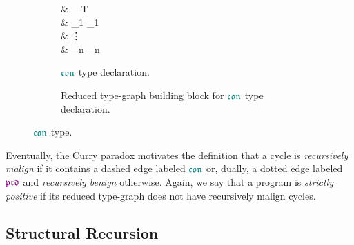 \begin{figure}[H]
  \begin{subfigure}[b]{0.25\textwidth}
    \begin{codealign}
      &
        \polcon\ \type\ T\ \where
      \\[-4pt]
      &\quad
        _{1} \Delta_{1}
      \\[-4pt]
      &\quad\quad
        \vdots
      \\[-4pt]
      &\quad
        _{n} \Delta_{n}
    \end{codealign}
    \caption{$\polcon$ type declaration.}
    \label{fig:mainideas:contg:cont}
  \end{subfigure}
  \begin{subfigure}[b]{0.7\textwidth}
    \caption{Reduced type-graph building block for $\polcon$ type declaration.}
    \label{fig:mainideas:contg:tg}
  \end{subfigure}
  \caption{$\polcon$ type.}
  \label{fig:mainideas:contg}
\end{figure}

Eventually, the Curry paradox motivates the definition that a cycle is \textit{recursively malign} if it contains a dashed edge labeled $\polcon$ or, dually, a dotted edge labeled $\polprd$ and \textit{recursively benign} otherwise.
Again, we say that a program is \textit{strictly positive} if its reduced type-graph does not have recursively malign cycles.

\subsection{Structural Recursion}
\label{sec:mainideas:sr}

